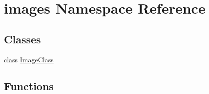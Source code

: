 \hypertarget{namespaceimages}{}\section{images Namespace Reference}
\label{namespaceimages}
\subsection*{Classes}
\begin{DoxyCompactItemize}
\item 
class \hyperlink{classimages_1_1ImageClass}{Image\+Class}
\end{DoxyCompactItemize}
\subsection*{Functions}
